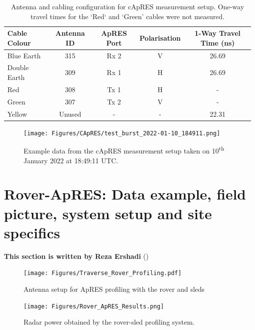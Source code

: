 \documentclass[a4paper,12pt]{article}
\begin{document}
\begin{table}[H]
  \centering
  \begin{tabular}[width=\textwidth]{l c c c c}
    \hline
    \rowcolor{gray!50}
    Cable Colour & Antenna ID & ApRES Port & Polarisation & 1-Way Travel Time (ns) \\
    \hline
    Blue Earth & 315 & Rx 2 & V & 26.69 \\
    Double Earth & 309 & Rx 1 & H & 26.69 \\
    Red & 308 & Tx 1 & H & - \\
    Green & 307 & Tx 2 & V  & - \\
    Yellow & Unused & - & - & 22.31 \\
    \hline
  \end{tabular}
  \caption{Antenna and cabling configuration for cApRES measurement setup.  
  One-way travel times for the `Red` and `Green' cables were not measured.}
  \label{TablecApRESCables}
\end{table}

\begin{figure}[h]
  \texttt{[image: Figures/CApRES/test\_burst\_2022-01-10\_184911.png]}
  \caption{Example data from the cApRES measurement setup taken on 10\textsuperscript{th}
  January 2022 at 18:49:11 UTC.}
\end{figure}
\clearpage
\pagebreak
\section{Rover-ApRES: Data example, field picture, system setup and site specifics}
\label{SecRoverApRES}
\textbf{This section is written by Reza Ershadi}
(\href{mailto:mohammadreza.ershadi@uni-tuebingen.de}{\color{blue}{Email Me}})\\
\begin{figure}[H]
	\texttt{[image: Figures/Traverse\_Rover\_Profiling.pdf]}
	\caption{Antenna setup for ApRES profiling with the rover and sleds}
	\label{fig_rover}
\end{figure}
\begin{figure}[H]
	\texttt{[image: Figures/Rover\_ApRES\_Results.png]}
	\caption{Radar power obtained by the rover-sled profiling system.}
	\label{fig_rover_res}
\end{figure}
\end{document}

